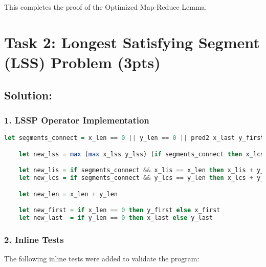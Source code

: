 \documentclass{article}
\begin{document}
This completes the proof of the Optimized Map-Reduce Lemma.

\section{Task 2: Longest Satisfying Segment (LSS) Problem (3pts)}
    \subsection*{Solution:}

    \subsubsection*{1. LSSP Operator Implementation}
    \begin{lstlisting}[language=Haskell]
    let segments_connect = x_len == 0 || y_len == 0 || pred2 x_last y_first

    let new_lss = max (max x_lss y_lss) (if segments_connect then x_lcs + y_lis else 0)

    let new_lis = if segments_connect && x_lis == x_len then x_lis + y_lis else x_lis
    let new_lcs = if segments_connect && y_lcs == y_len then x_lcs + y_lcs else y_lcs

    let new_len = x_len + y_len

    let new_first = if x_len == 0 then y_first else x_first
    let new_last  = if y_len == 0 then x_last else y_last
    \end{lstlisting}

    \subsubsection*{2. Inline Tests}
    The following inline tests were added to validate the program:
\end{document}
